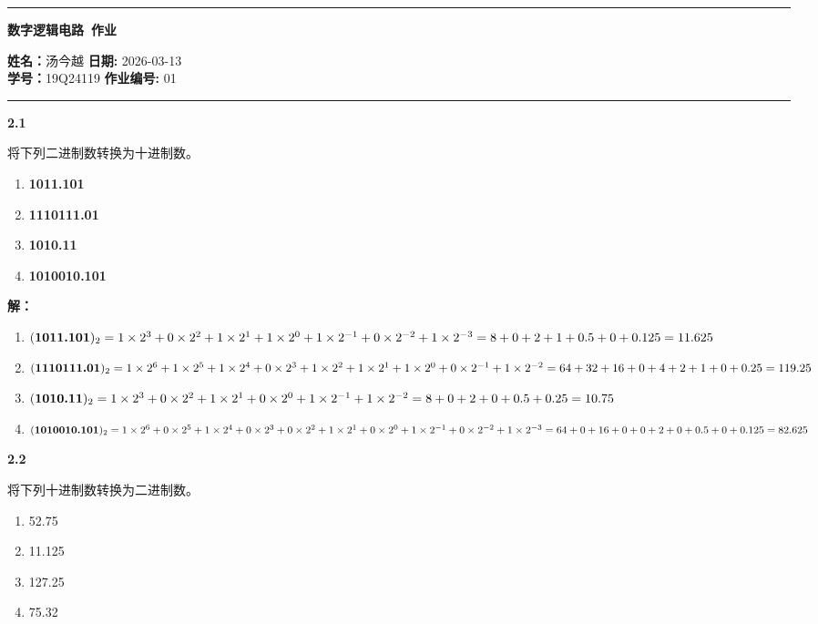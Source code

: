 \documentclass[10pt, a4paper]{article}
\newcommand{\question}[2]{
    \vspace{2ex}\noindent\textbf{#1}\ {\kaishu #2} \par\vspace{1ex}
}
\newcommand{\solution}[1]{
    \noindent\textbf{解：}{\songti #1} \par\vspace{3ex}
}
\begin{document}
\thispagestyle{plain}
\begin{center}
	\hrule
	\vspace{.4cm}
	{\textbf { \large 数字逻辑电路\ 作业}}
\end{center}
{ \textbf{姓名：}}汤今越 \hspace{\fill} \textbf{日期:} 2026-03-13 \\
{ \textbf{学号：}}19Q24119 \hspace{\fill} \textbf{作业编号:} 01 \\
	\hrule
\vspace{3ex}


\question{2.1}{
将下列二进制数转换为十进制数。
\begin{enumerate}
	\item \textbf{1011.101}
	\item \textbf{1110111.01}
	\item \textbf{1010.11}
	\item \textbf{1010010.101}
\end{enumerate}
}

\solution{
\begin{enumerate}
	\item $ (\textbf{1011.101})_2 = 1\times2^3 + 0\times2^2 + 1\times2^1 + 1\times2^0 + 1\times2^{-1} + 0\times2^{-2} + 1\times2^{-3} \\ = 8 + 0 + 2 + 1 + 0.5 + 0 + 0.125 = 11.625 $
    \item $ (\textbf{1110111.01})_2 = 1\times2^6 + 1\times2^5 + 1\times2^4 + 0\times2^3 + 1\times2^2 + 1\times2^1 + 1\times2^0 + 0\times2^{-1} + 1\times2^{-2} \\
        = 64 + 32 + 16 + 0 + 4 + 2 + 1 + 0 + 0.25 = 119.25 $
    \item $ (\textbf{1010.11})_2 = 1\times2^3 + 0\times2^2 + 1\times2^1 + 0\times2^0 + 1\times2^{-1} + 1\times2^{-2} \\ = 8 + 0 + 2 + 0 + 0.5 + 0.25 = 10.75 $
    \item $ (\textbf{1010010.101})_2 = 1\times2^6 + 0\times2^5 + 1\times2^4 + 0\times2^3 + 0\times2^2 + 1\times2^1 + 0\times2^0 + 1\times2^{-1} + 0\times2^{-2} + 1\times2^{-3} \\ = 64 + 0 + 16 + 0 + 0 + 2 + 0 + 0.5 + 0 + 0.125 = 82.625\ $
\end{enumerate}
}


\question{2.2}{
将下列十进制数转换为二进制数。
\begin{enumerate}
	\item 52.75
	\item 11.125
	\item 127.25
	\item 75.32
\end{enumerate}
}
\end{document}
